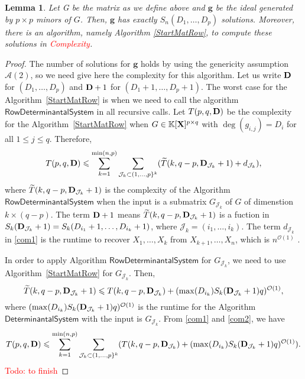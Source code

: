 \documentclass[11pt]{article}
\numberwithin{Property}{section}
\numberwithin{Theorem}{section}
\numberwithin{Proposition}{section}
\newtheorem{Lemma}{Lemma}%
\numberwithin{Lemma}{section}
\numberwithin{Corollary}{section}
\numberwithin{Definition}{section}
\numberwithin{Remark}{section}
\numberwithin{Conjecture}{section}
\numberwithin{Problem}{section}
\numberwithin{Claim}{section}
\theoremstyle{definition}
\numberwithin{Example}{section}
\def\g {\ensuremath{\mathbf{g}}}
\renewcommand{\leq}{\leqslant}
\newcommand{\bigO}[1]{\mathcal{O}(#1)} %
\newcommand{\field}{\mathbb{K}} %
\newcommand{\mat}[1]{\mathbf{\MakeUppercase{#1}}} %
\newcommand{\todo}[1]{\textcolor{red}{#1}} %
\begin{document}
\begin{Lemma}\label{P3} Let G be the matrix as we define above and $\g$ be the ideal generated by $p \times p$ minors of $G$. Then, $\g$ has exactly $S_{n}(D_1, \ldots, D_p)$ solutions. Moreover, there is an algorithm, namely Algorithm \ref{StartMatRow}, to compute these solutions in \todo{Complexity}. 
\end{Lemma}
\begin{proof}
The number of solutions for $\g$ holds by using the genericity assumption $\mathcal{A}(2)$, so we need give here the complexity for this algorithm. Let us write ${\bf D}$ for $(D_1, \ldots, D_p)$ and ${\bf D} + 1$ for $(D_1+1, \ldots, D_p+1)$. The worst case for the Algorithm~\ref{StartMatRow} is when we need to call the algorithm $\mathsf{RowDeterminantal System}$ in all recursive calls. Let $T(p,q,{\bf D})$ be the complexity for the Algorithm~\ref{StartMatRow} when $G \in \field[\mat{X}]^{p \times q}$ with $\deg(g_{i,j}) = D_i$ for all $1 \leq j \leq q$. Therefore, 
\begin{equation} \label{com1}
T(p,q,{\bf D}) \leq \sum_{k=1}^{\min(n,p)} \sum_{\mathcal{J}_k \subset (1, \ldots, p\}^k} ( \widetilde{T}(k,q-p,{\bf D}_{\mathcal{J}_k}+1) + d_{\mathcal{J}_k}),
\end{equation}
where $\widetilde{T}(k,q-p,{\bf D}_{\mathcal{J}_k}+1)$ is the complexity of the Algorithm $\mathsf{Row Determinantal System}$ when the input is a submatrix $G_{\mathcal{J}_k}$ of $G$ of dimenstion $k \times (q-p)$. The term ${\bf D} + 1$ means  $\widetilde{T}(k,q-p,{\bf D}_{\mathcal{J}_k}+1)$ is a fuction in $S_k({\bf D}_{\mathcal{J}_k}+1) = S_{k}(D_{i_1} + 1, \ldots, D_{i_k}+1)$, where $\mathcal{J}_k = (i_1, \ldots, i_k)$. The term $d_{\mathcal{J}_k} $ in \cref{com1} is the runtime to recover $X_1, \ldots, X_k$ from $X_{k+1}, \ldots, X_n$, which is $n^{\bigO{1}}$ . 

In order to apply Algorithm $\mathsf{Row Determinantal System}$ for $G_{\mathcal{J}_k}$, we need to use Algorithm~\ref{StartMatRow} for $G_{\mathcal{J}_k}$. Then, 
\begin{equation} \label{com2}
\widetilde{T}(k,q-p,{\bf D}_{\mathcal{J}_k}+1) \leq T(k, q-p, {\bf D}_{\mathcal{J}_k}) + (\max(D_{i_k})S_k({\bf D}_{\mathcal{J}_k}+1)q)^{\bigO{1}}, 
\end{equation}
where $(\max(D_{i_k})S_k({\bf D}_{\mathcal{J}_k}+1)q)^{\bigO{1}}$ is the runtime for the Algorithm $\mathsf{Determinantal System}$ with the input is $G_{\mathcal{J}_k}$. From \cref{com1} and \cref{com2}, we have 
\begin{equation} \label{com}
T(p,q,{\bf D})  \leq \sum_{k=1}^{\min(n,p)} \sum_{\mathcal{J}_k \subset (1, \ldots, p\}^k} (T(k, q-p, {\bf D}_{\mathcal{J}_k}) + (\max(D_{i_k})S_k({\bf D}_{\mathcal{J}_k}+1)q)^{\bigO{1}}).
\end{equation}
\todo{Todo: to finish}
\end{proof}
\end{document}
